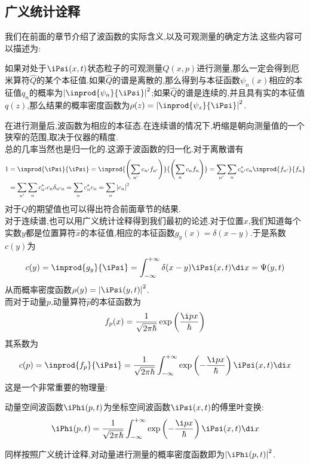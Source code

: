 \documentclass{ctexart}
\begin{document}
\subsection{广义统计诠释}
我们在前面的章节介绍了波函数的实际含义,以及可观测量的确定方法.这些内容可以描述为:
\begin{theorem}[广义统计诠释]
    如果对处于$\iPsi(x,t)$状态粒子的可观测量$Q(x,p)$进行测量,那么一定会得到厄米算符$\hat{Q}$的某个本征值.如果$\hat{Q}$的谱是离散的,那么得到与本征函数$\psi_n(x)$相应的本征值$q_n$的概率为$\left|\inprod{\psi_n}{\iPsi}\right|^2$;如果$\hat{Q}$的谱是连续的,并且具有实的本征值$q(z)$,那么结果的概率密度函数为$\rho(z)=\left|\inprod{\psi_z}{\iPsi}\right|^2$.
\end{theorem}
在进行测量后,波函数为相应的本征态.在连续谱的情况下,坍缩是朝向测量值的一个狭窄的范围,取决于仪器的精度.\\
\indent 总的几率当然也是归一化的.这源于波函数的归一化.对于离散谱有
\[\begin{aligned}
    1
    &=\inprod{\iPsi}{\iPsi}=\inprod{\left(\sum_{n'}c_{n'}f_{n'}\right)}{\left(\sum_{n}c_{n}f_{n}\right)}=\sum_{n'}\sum_{n}c_{n'}^\ast c_{n}\inprod{f_{n'}}{f_n}\\
    &=\sum_{n'}\sum_{n}c_{n'}^\ast c_{n}\delta_{n'n}=\sum_{n}c_n^\ast c_n=\sum_{n}\left|c_n\right|^2
\end{aligned}\]
对于$Q$的期望值也可以得出符合前面章节的结果.\\
\indent 对于连续谱,也可以用广义统计诠释得到我们最初的论述.对于位置$x$,我们知道每个实数$y$都是位置算符$\hat{x}$的本征值,相应的本征函数$g_y(x)=\delta(x-y)$.于是系数$c(y)$为
\[c(y)=\inprod{g_y}{\iPsi}=\int_{-\infty}^{+\infty}\delta(x-y)\iPsi(x,t)\di x=\Psi(y,t)\]
从而概率密度函数$\rho(y)=\left|\iPsi(y,t)\right|^2$.\\
\indent 而对于动量$p$,动量算符$\hat{p}$的本征函数为
\[f_p(x)=\dfrac{1}{\sqrt{2\pi\hbar}}\exp\left(\dfrac{\i px}{\hbar}\right)\]
其系数为
\[c(p)=\inprod{f_p}{\iPsi}=\dfrac{1}{\sqrt{2\pi\hbar}}\int_{-\infty}^{+\infty}\exp\left(-\dfrac{\i px}{\hbar}\right)\iPsi(x,t)\di x\]
这是一个非常重要的物理量:
\begin{definition}[动量空间波函数]
    动量空间波函数$\iPhi(p,t)$为坐标空间波函数$\iPsi(x,t)$的傅里叶变换:
    \[\iPhi(p,t)=\dfrac{1}{\sqrt{2\pi\hbar}}\int_{-\infty}^{+\infty}\exp\left(-\dfrac{\i px}{\hbar}\right)\iPsi(x,t)\di x\]
\end{definition}
同样按照广义统计诠释,对动量进行测量的概率密度函数即为$\left|\iPhi(p,t)\right|^2$.
\end{document}
